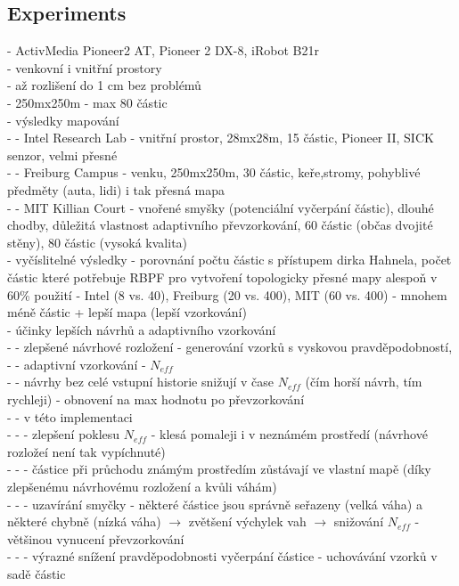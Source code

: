\documentclass[11pt]{article}
\begin{document}
\subsection{Experiments}
 - ActivMedia Pioneer2 AT, Pioneer 2 DX-8, iRobot B21r\\
 - venkovní i vnitřní prostory\\
 - až rozlišení do 1 cm bez problémů\\
 - 250mx250m - max 80 částic\\
 - výsledky mapování \\
 - - Intel Research Lab - vnitřní prostor, 28mx28m, 15 částic, Pioneer II, SICK senzor, velmi přesné\\
 - - Freiburg Campus - venku, 250mx250m, 30 částic, keře,stromy, pohyblivé předměty (auta, lidi) i tak přesná mapa\\
 - - MIT Killian Court - vnořené smyšky (potenciální vyčerpání částic), dlouhé chodby, důležitá vlastnost adaptivního převzorkování, 60 částic (občas dvojité stěny), 80 částic (vysoká kvalita)\\
 - vyčíslitelné výsledky - porovnání počtu částic s přístupem dirka Hahnela, počet částic které potřebuje RBPF pro vytvoření topologicky přesné mapy alespoň v 60\% použití - Intel (8 vs. 40), Freiburg (20 vs. 400), MIT (60 vs. 400) - mnohem méně částic + lepší mapa (lepší vzorkování) \\
 - účinky lepších návrhů a adaptivního vzorkování\\
 - - zlepšené návrhové rozložení - generování vzorků s vyskovou pravděpodobností, \\
 - - adaptivní vzorkování - $N_{eff}$\\
 - - návrhy bez celé vstupní historie snižují v čase $N_{eff}$ (čím horší návrh, tím rychleji) - obnovení na max hodnotu po převzorkování\\
 - - v této implementaci\\
 - - - zlepšení poklesu $N_{eff}$ - klesá pomaleji i v neznámém prostředí (návrhové rozložeí není tak vypíchnuté)\\
 - - - částice při průchodu známým prostředím zůstávají ve vlastní mapě (díky zlepšenému návrhovému rozložení a kvůli váhám)\\
 - - - uzavírání smyčky - některé částice jsou správně seřazeny (velká váha) a některé chybně (nízká váha) $\rightarrow$ zvětšení výchylek vah $\rightarrow$ snižování $N_{eff}$ - většinou vynucení převzorkování\\
 - - - výrazné snížení pravděpodobnosti vyčerpání částice - uchovávání vzorků v sadě částic\\
\end{document}
